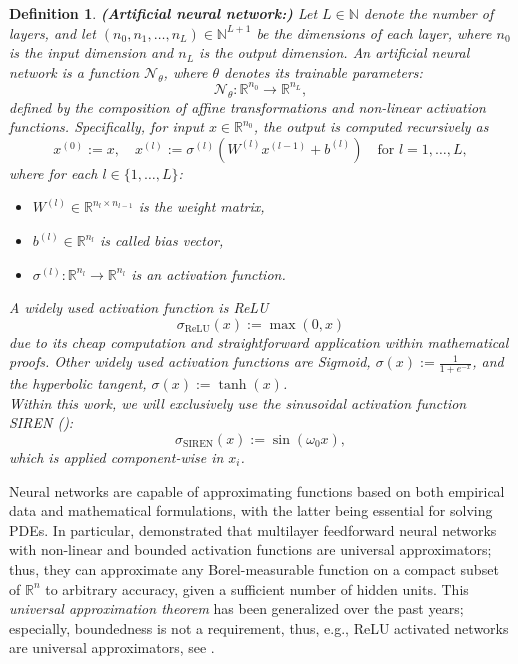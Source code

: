 \documentclass[draft,12pt,openany]{book}
\newcommand{\R}{\mathbb{R}}
\theoremstyle{plainnormal}
\newtheorem{definition}[theorem]{Definition}
\theoremstyle{remark}
\begin{document}
\begin{definition}\textbf{(Artificial neural network:)}
   Let \( L \in \mathbb{N} \) denote the number of layers, and let \( (n_0, n_1, \dots, n_L) \in \mathbb{N}^{L+1} \) be the dimensions of each layer, where \( n_0 \) is the input dimension and \( n_L \) is the output dimension. An \textit{artificial neural network} is a function $\mathcal{N}_\theta$, where $\theta$ denotes its trainable parameters:
\[
\mathcal{N}_\theta: \mathbb{R}^{n_0} \rightarrow \mathbb{R}^{n_L},
\]
defined by the composition of affine transformations and non-linear activation functions. Specifically, for input \( x \in \mathbb{R}^{n_0} \), the output is computed recursively as
\[
x^{(0)} := x, \quad x^{(l)} := \sigma^{(l)}(W^{(l)} x^{(l-1)} + b^{(l)}) \quad \text{for } l = 1, \dots, L,
\]
where for each \( l \in \{1, \dots, L\} \):
\begin{itemize}
    \item \( W^{(l)} \in \mathbb{R}^{n_l \times n_{l-1}} \) is the weight matrix,
    \item \( b^{(l)} \in \mathbb{R}^{n_l} \) is called bias vector,
    \item \( \sigma^{(l)}: \mathbb{R}^{n_l} \rightarrow \mathbb{R}^{n_l} \) is an activation function.
\end{itemize}
A widely used activation function is ReLU $$\sigma_{\text{ReLU}}(x) := \max(0, x)$$
due to its cheap computation and straightforward application within mathematical proofs. Other widely used activation functions are Sigmoid, $\sigma(x) := \frac{1}{1+e^{-x}} $, and the hyperbolic tangent, $\sigma(x) :=\tanh(x)$.\\
Within this work, we will exclusively use the sinusoidal activation function SIREN (\cite{sitzmann2020implicitneuralrepresentationsperiodic}): $$\sigma_{\text{SIREN}}(x) := \sin(\omega_0 x),$$
which is applied component-wise in $x_i$.
\end{definition}
Neural networks are capable of approximating functions based on both empirical data and mathematical formulations, with the latter being essential for solving PDEs. In particular, \cite{HORNIK1989359} demonstrated that multilayer feedforward neural networks with non-linear and bounded activation functions are universal approximators; thus, they can approximate any Borel-measurable function on a compact subset of $\R^n$ to arbitrary accuracy, given a sufficient number of hidden units. This \emph{universal approximation theorem} has been generalized over the past years; especially, boundedness is not a requirement, thus, e.g., ReLU activated networks are universal approximators, see \cite{petersen2018optimalapproximationpiecewisesmooth}. \\
\end{document}
